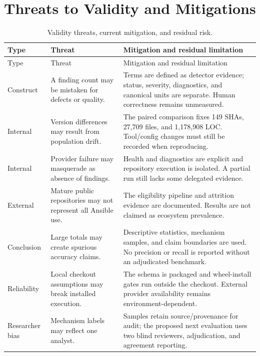\section{Threats to Validity and Mitigations}
\begin{longtable}{p{3.0cm}p{5.4cm}p{5.7cm}}
\caption{Validity threats, current mitigation, and residual risk.}
\label{tab:validity_matrix}\\
\toprule Type & Threat & Mitigation and residual limitation \\
\midrule\endfirsthead
\toprule Type & Threat & Mitigation and residual limitation \\
\midrule\endhead
Construct & A finding count may be mistaken for defects or quality. & Terms are
defined as detector evidence; status, severity, diagnostics, and canonical
units are separate. Human correctness remains unmeasured. \\
Internal & Version differences may result from population drift. & The paired
comparison fixes 149 SHAs, 27,709 files, and 1,178,908 LOC. Tool/config changes
must still be recorded when reproducing. \\
Internal & Provider failure may masquerade as absence of findings. & Health and
diagnostics are explicit and repository execution is isolated. A partial run
still lacks some delegated evidence. \\
External & Mature public repositories may not represent all Ansible use. & The
eligibility pipeline and attrition evidence are documented. Results are not
claimed as ecosystem prevalence. \\
Conclusion & Large totals may create spurious accuracy claims. & Descriptive
statistics, mechanism samples, and claim boundaries are used. No precision or
recall is reported without an adjudicated benchmark. \\
Reliability & Local checkout assumptions may break installed execution. & The
schema is packaged and wheel-install gates run outside the checkout. External
provider availability remains environment-dependent. \\
Researcher bias & Mechanism labels may reflect one analyst. & Samples retain
source/provenance for audit; the proposed next evaluation uses two blind
reviewers, adjudication, and agreement reporting. \\
\bottomrule
\end{longtable}

